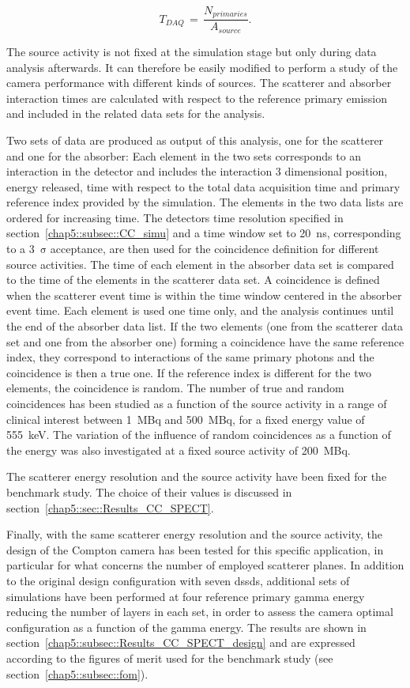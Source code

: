 \begin{equation}
T_{DAQ}\, = \,\frac{N_{primaries}}{A_{source}}.
\label{chap5::eq::DAQ_time}
\end{equation} 

The source activity is not fixed at the simulation stage but only during data analysis afterwards. It can therefore be easily modified to perform a study of the camera performance with different kinds of sources. The scatterer and absorber interaction times are calculated with respect to the reference primary emission and included in the related data sets for the analysis.

Two sets of data are produced as output of this analysis, one for the scatterer and one for the absorber: Each element in the two sets corresponds to an interaction in the detector and includes the interaction 3 dimensional position, energy released, time with respect to the total data acquisition time and primary reference index provided by the simulation. The elements in the two data lists are ordered for increasing time. The detectors time resolution specified in section~\ref{chap5::subsec::CC_simu} and a time window set to 20~ns, corresponding to a 3~$\mathrm{\sigma}$ acceptance, are then used for the coincidence definition for different source activities. The time of each element in the absorber data set is compared to the time of the elements in the scatterer data set. A coincidence is defined when the scatterer event time is within the time window centered in the absorber event time. Each element is used one time only, and the analysis continues until the end of the absorber data list. If the two  elements (one from the scatterer data set and one from the absorber one) forming a coincidence have the same reference index, they correspond to interactions of the same primary photons and the coincidence is then a true one. If the reference index is different for the two elements, the coincidence is random. The number of true and random coincidences has been studied as a function of the source activity in a range of clinical interest between 1~MBq and 500~MBq, for a fixed energy value of 555~keV. The variation of the influence of random coincidences as a function of the energy was also investigated at a fixed source activity of 200~MBq.

The scatterer energy resolution and the source activity have been fixed for the benchmark study. The choice of their values is discussed in section~\ref{chap5::sec::Results_CC_SPECT}. 

Finally, with the same scatterer energy resolution and the source activity, the design of the Compton camera has been tested for this specific application, in particular for what concerns the number of employed scatterer planes. In addition to the original design configuration with seven \glspl{dssd}, additional sets of simulations have been performed at four reference primary gamma energy reducing the number of layers in each set, in order to assess the camera optimal configuration as a function of the gamma energy. The results are shown in section~\ref{chap5::subsec::Results_CC_SPECT_design} and are expressed according to the figures of merit used for the benchmark study (see section~\ref{chap5::subsec::fom}). 

